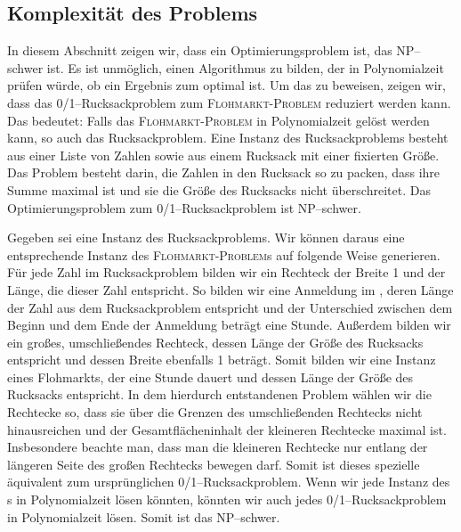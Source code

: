 \subsection{Komplexität des Problems}\label{sec:komplexitaet}



In diesem Abschnitt zeigen wir, dass \fp{} ein Optimierungsproblem ist, das NP--schwer ist.
Es ist unmöglich, einen Algorithmus zu bilden, der in Polynomialzeit prüfen würde,
ob ein Ergebnis zum \fp{} optimal ist. 
Um das zu beweisen, zeigen wir, dass das
0/1--Rucksackproblem zum \textsc{Floh\-markt-\-Pro\-blem} reduziert werden kann.
Das bedeutet: Falls das \textsc{Floh\-markt-\-Pro\-blem} in Polynomialzeit gelöst werden kann,
so auch das Rucksackproblem.
Eine Instanz des Rucksackproblems besteht aus einer Liste von Zahlen
sowie aus einem Rucksack mit einer fixierten Größe.
Das Problem besteht darin, die Zahlen in den Rucksack 
so zu packen, dass ihre Summe maximal ist und sie die Größe des Rucksacks nicht überschreitet.
Das Optimierungsproblem zum 0/1--Rucksackproblem ist NP--schwer.\cite{garey_johnson_2009}


Gegeben sei eine Instanz des Rucksackproblems.
Wir können daraus eine entsprechende Instanz des \textsc{Floh\-markt-\-Pro\-blem}s auf folgende Weise generieren.
Für jede Zahl im Rucksackproblem bilden wir ein Rechteck der Breite 1 und der Länge, die 
dieser Zahl entspricht.
So bilden wir eine Anmeldung im \fp{}, deren Länge der
Zahl aus dem Rucksackproblem entspricht und der Unterschied zwischen
dem Beginn und dem Ende der Anmeldung beträgt eine Stunde.
Außerdem bilden wir ein großes, umschließendes Rechteck, dessen Länge der Größe des Rucksacks entspricht
und dessen Breite ebenfalls 1 beträgt.
Somit bilden wir eine Instanz eines Flohmarkts, der eine Stunde dauert und dessen 
Länge der Größe des Rucksacks entspricht.
In dem hierdurch entstandenen Problem wählen wir die Rechtecke so, 
dass sie über die Grenzen des umschließenden Rechtecks nicht hinausreichen
und der Gesamtflächeninhalt der kleineren Rechtecke maximal ist. 
Insbesondere beachte man, dass man die kleineren Rechtecke nur entlang der längeren
Seite des großen Rechtecks bewegen darf.
Somit ist dieses spezielle \fp{} äquivalent zum ursprünglichen 0/1--Rucksackproblem.
Wenn wir jede Instanz des \fp s in Polynomialzeit lösen könnten,
könnten wir auch jedes 0/1--Rucksackproblem in Polynomialzeit lösen.
Somit ist das \fp{} NP--schwer.

